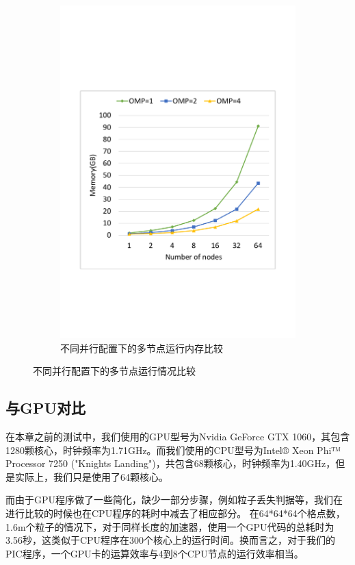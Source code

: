 \begin{figure}[!htb]
\begin{subfigure}[b]{0.48\textwidth}
        \includegraphics[width=\textwidth]{Img/PIC_speedup_Cori_multi_nodes_memory.pdf}
        \caption{不同并行配置下的多节点运行内存比较}
    \end{subfigure}
    \caption{不同并行配置下的多节点运行情况比较}\label{fig:PIC_speedup_Cori_multi_nodes_timeMemory}
\end{figure}

\subsection{与GPU对比}

在本章之前的测试中，我们使用的GPU型号为Nvidia GeForce GTX 1060，其包含1280颗核心，时钟频率为1.71GHz。而我们使用的CPU型号为Intel® Xeon Phi™ Processor 7250 ("Knights Landing")，共包含68颗核心，时钟频率为1.40GHz，但是实际上，我们只是使用了64颗核心。

而由于GPU程序做了一些简化，缺少一部分步骤，例如粒子丢失判据等，我们在进行比较的时候也在CPU程序的耗时中减去了相应部分。
在64*64*64个格点数，1.6m个粒子的情况下，对于同样长度的加速器，使用一个GPU代码的总耗时为3.56秒，这类似于CPU程序在300个核心上的运行时间。换而言之，对于我们的PIC程序，一个GPU卡的运算效率与4到8个CPU节点的运行效率相当。

